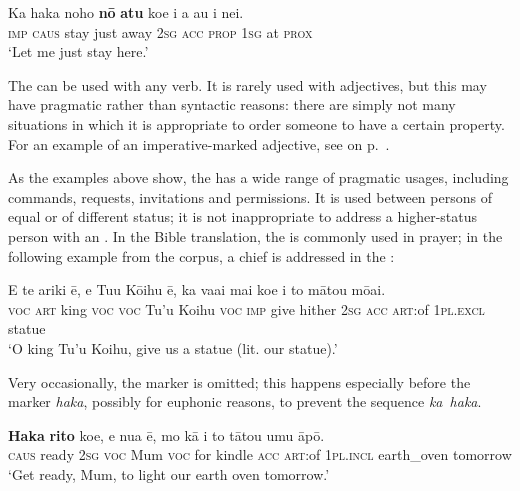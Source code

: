 \ea\label{ex:10.7}
\gll Ka haka noho \textbf{nō} \textbf{atu} koe i a au {\ꞌ}i nei. \\
\textsc{imp} \textsc{caus} stay just away \textsc{2sg} \textsc{acc} \textsc{prop} \textsc{1sg} at \textsc{prox} \\

\glt 
‘Let me just stay here.’ \textstyleExampleref{[R229.013]} 
\z

The  can be used with any verb. It is rarely used with adjectives, but this may have pragmatic rather than syntactic reasons: there are simply not many situations in which it is appropriate to order someone to have a certain property. For an example of an imperative-marked adjective, see  on p.~\pageref{ex:3.90}.

As the examples above show, the  has a wide range of pragmatic usages, including commands, requests, invitations and permissions. It is used between persons of equal or of different status; it is not inappropriate to address a higher-status person with an . In the Bible translation, the  is commonly used in prayer; in the following example from the corpus, a chief is addressed in the :

\ea\label{ex:10.8}
\gll E te {\ꞌ}ariki ē, e Tu{\ꞌ}u Kōihu ē, ka va{\ꞌ}ai mai koe  i to mātou mōai.\\
\textsc{voc} \textsc{art} king \textsc{voc} \textsc{voc} Tu’u Koihu \textsc{voc} \textsc{imp} give hither \textsc{2sg}  \textsc{acc} \textsc{art}:of \textsc{1pl.excl} statue\\

\glt 
‘O king Tu’u Koihu, give us a statue (lit. our statue).’ \textstyleExampleref{[Mtx-4-01.048]}
\z

Very occasionally, the  marker is omitted; this happens especially before the  marker \textit{haka}, possibly for euphonic reasons, to prevent the sequence \textit{ka~haka}.

\ea\label{ex:10.9}
\gll \textbf{Haka} \textbf{rito} koe, e nua ē, mo kā i to tātou {\ꞌ}umu āpō. \\
\textsc{caus} ready \textsc{2sg} \textsc{voc} Mum \textsc{voc} for kindle \textsc{acc} \textsc{art}:of \textsc{1pl.incl} earth\_oven tomorrow \\

\glt 
‘Get ready, Mum, to light our earth oven tomorrow.’ \textstyleExampleref{[R352.041]} 
\z

